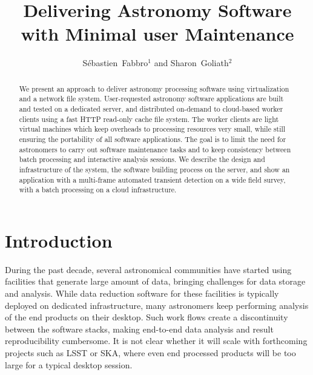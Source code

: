 
\resetcounters




\title{Delivering Astronomy Software with Minimal user Maintenance}

\author{S\'ebastien~Fabbro$^1$ and Sharon~Goliath$^2$
}


\begin{abstract}
  We present an approach to deliver astronomy processing software using   virtualization and a network file system. User-requested astronomy   software applications are built and tested on a dedicated server, and  distributed on-demand to cloud-based worker clients using a fast HTTP read-only cache file system. The worker clients are light virtual machines which keep overheads to processing resources very small, while still ensuring the portability of all software applications. The goal is to limit the need for astronomers to carry out software maintenance tasks and to keep consistency between batch processing and interactive analysis sessions. We describe the design and infrastructure of the system, the software building process on the server, and show an application with a multi-frame automated transient detection on a wide field survey, with a batch processing on a cloud infrastructure.
\end{abstract}

\section{Introduction}
During the past decade, several astronomical communities have started using facilities that generate large amount of data, bringing challenges for data storage and analysis. While data reduction software for these facilities is typically deployed on dedicated infrastructure, many astronomers keep performing analysis of the end products on their desktop. Such work flows create a discontinuity between the software stacks, making end-to-end data analysis and result reproducibility cumbersome. It is not clear whether it will scale with forthcoming projects such as LSST or SKA, where even end processed products will be too large for a typical desktop session.

